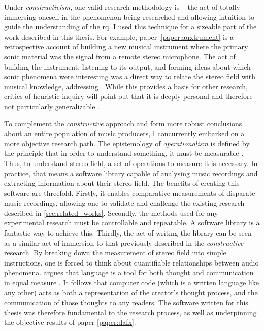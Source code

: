 Under \textit{constructivism}, one valid research methodology is  -- the act of totally immersing oneself in the phenomenon being researched and allowing intuition to guide the understanding of the \gls{rq}. I used this technique for a sizeable part of the work described in this thesis. For example, {paper~\ref{paper:auxtrument}} is a retrospective account of building a new musical instrument where the primary sonic material was the signal from a remote stereo microphone. The act of building the instrument, listening to its output, and forming ideas about which sonic phenomena were interesting was a direct way to relate the stereo field with musical knowledge, addressing \rqa{}. While this provides a basis for other research, critics of heuristic inquiry will point out that it is deeply personal and therefore not particularly generalizable \cite{grayDoingResearchReal2004}.

To complement the \textit{constructive} approach and form more robust conclusions about an entire population of music producers, I concurrently embarked on a more objective research path. The epistemology of \textit{operationalism} is defined by the principle that in order to understand something, it must be measurable \cite{changOperationalism2021}. Thus, to understand stereo field, a set of operations to measure it is necessary. In practice, that means a software library capable of analysing music recordings and extracting information about their stereo field. The benefits of creating this software are threefold. Firstly, it enables comparative measurements of disparate music recordings, allowing one to validate and challenge the existing research described in \cref{sec:related_works}. Secondly, the methods used for any experimental research must be controllable and repeatable. A software library is a fantastic way to achieve this. Thirdly, the act of writing the library can be seen as a similar act of immersion to that previously described in the \textit{constructive} research. By breaking down the measurement of stereo field into simple instructions, one is forced to think about quantifiable relationships between audio phenomena. \citeauthor{wiltschkoLanguageThoughtCommunication2022} argues that language is a tool for both thought and communication in equal measure \cite{wiltschkoLanguageThoughtCommunication2022}. It follows that computer code (which is a written language like any other) acts as both a representation of the creator's thought process, and the communication of those thoughts to any readers. The software written for this thesis was therefore fundamental to the research process, as well as underpinning the objective results of paper \ref{paper:dafx}.


